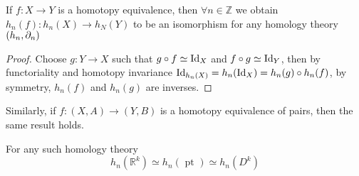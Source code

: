 \documentclass[../main.tex]{subfiles}
\begin{document}
\begin{lemma}
If $f:X\to Y$ is a homotopy equivalence, then $\forall n \in \mathbb{Z}$ we obtain $h_n( f) : h_n( X) \to h_N( Y) $ to be an isomorphism for any homology theory $( h_n, \partial_n) $ 
\end{lemma}
\begin{proof}
Choose $g:Y \to X$  such that $g\circ f \simeq \operatorname{Id}_X$ and $f\circ g \simeq \operatorname{Id}_Y$, then by functoriality and homotopy invariance $\operatorname{Id}_{h_n( X) } =h_n( \operatorname{Id}_X) = h_n( g) \circ h_n( f)$, by symmetry, $h_n( f) $ and $h_n( g) $ are inverses.
\end{proof}
Similarly, if $f: ( X,A) \to ( Y,B) $ is a homotopy equivalence of pairs, then the same result holds.
\begin{exemple}
For any such homology theory 
\[ 
h_n(  \mathbb{R}^{k}) \simeq h_n( \text{ pt } ) \simeq h_n ( D^{k}) 
\]

\end{exemple}
\end{document}
